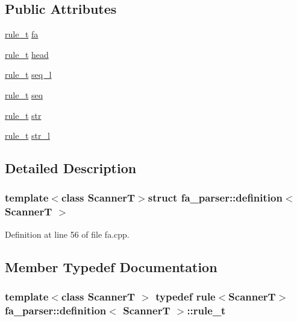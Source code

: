 \subsection*{Public Attributes}
\begin{DoxyCompactItemize}
\item 
\hyperlink{structfa__parser_1_1definition_afa348afda38b7917e6a6b9ab5bf954fd}{rule\+\_\+t} \hyperlink{structfa__parser_1_1definition_a48eca12d36bc711248eebb4f850a83c8}{fa}
\item 
\hyperlink{structfa__parser_1_1definition_afa348afda38b7917e6a6b9ab5bf954fd}{rule\+\_\+t} \hyperlink{structfa__parser_1_1definition_a9ac398c08482622c6231ca45ae3637c7}{head}
\item 
\hyperlink{structfa__parser_1_1definition_afa348afda38b7917e6a6b9ab5bf954fd}{rule\+\_\+t} \hyperlink{structfa__parser_1_1definition_acb61c19eed7df6831e569ba26e260f71}{seq\+\_\+l}
\item 
\hyperlink{structfa__parser_1_1definition_afa348afda38b7917e6a6b9ab5bf954fd}{rule\+\_\+t} \hyperlink{structfa__parser_1_1definition_af773d1e41b99324de86ac074ef275379}{seq}
\item 
\hyperlink{structfa__parser_1_1definition_afa348afda38b7917e6a6b9ab5bf954fd}{rule\+\_\+t} \hyperlink{structfa__parser_1_1definition_a9b16d6bb1530e878a04ccd364dc2302e}{str}
\item 
\hyperlink{structfa__parser_1_1definition_afa348afda38b7917e6a6b9ab5bf954fd}{rule\+\_\+t} \hyperlink{structfa__parser_1_1definition_a458a9f843e27dd3579418e2f1f39d4d0}{str\+\_\+l}
\end{DoxyCompactItemize}


\subsection{Detailed Description}
\subsubsection*{template$<$class Scanner\+T$>$struct fa\+\_\+parser\+::definition$<$ Scanner\+T $>$}



Definition at line 56 of file fa.\+cpp.



\subsection{Member Typedef Documentation}
\hypertarget{structfa__parser_1_1definition_afa348afda38b7917e6a6b9ab5bf954fd}{
\subsubsection[{rule\+\_\+t}]{\setlength{\rightskip}{0pt plus 5cm}template$<$class Scanner\+T $>$ typedef rule$<$Scanner\+T$>$ {\bf fa\+\_\+parser\+::definition}$<$ Scanner\+T $>$\+::{\bf rule\+\_\+t}}}\label{structfa__parser_1_1definition_afa348afda38b7917e6a6b9ab5bf954fd}


